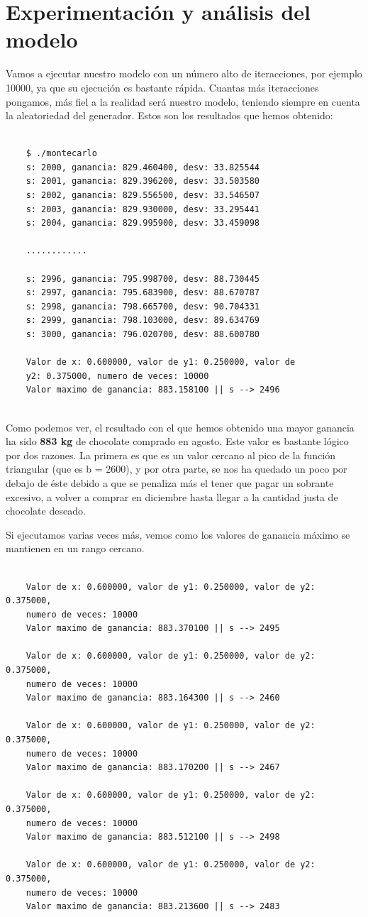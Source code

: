 \documentclass[11pt,a4paper]{article}
\begin{document}
\newpage
\section{Experimentación y análisis del modelo}

Vamos a ejecutar nuestro modelo con un número alto de iteracciones, por ejemplo 10000, ya que su ejecución es bastante rápida. Cuantas más iteracciones
pongamos, más fiel a la realidad será nuestro modelo, teniendo siempre en cuenta la aleatoriedad del generador. Estos son los resultados que hemos
obtenido:
\begin{lstlisting}

	$ ./montecarlo
	s: 2000, ganancia: 829.460400, desv: 33.825544
	s: 2001, ganancia: 829.396200, desv: 33.503580
	s: 2002, ganancia: 829.556500, desv: 33.546507
	s: 2003, ganancia: 829.930000, desv: 33.295441
	s: 2004, ganancia: 829.995900, desv: 33.459098

	............

	s: 2996, ganancia: 795.998700, desv: 88.730445
	s: 2997, ganancia: 795.683900, desv: 88.670787
	s: 2998, ganancia: 798.665700, desv: 90.704331
	s: 2999, ganancia: 798.103000, desv: 89.634769
	s: 3000, ganancia: 796.020700, desv: 88.600780

	Valor de x: 0.600000, valor de y1: 0.250000, valor de
	y2: 0.375000, numero de veces: 10000
	Valor maximo de ganancia: 883.158100 || s --> 2496
	
\end{lstlisting}

Como podemos ver, el resultado con el que hemos obtenido una mayor ganancia ha sido \textbf{883 kg} de chocolate comprado en agosto. Este valor es
bastante lógico por dos razones. La primera es que es un valor cercano al pico de la función triangular (que es b = 2600), y por otra parte, se nos ha
quedado un poco por debajo de éste debido a que se penaliza más el tener que pagar un sobrante excesivo, a volver a comprar en diciembre hasta llegar a
la cantidad justa de chocolate deseado.

Si ejecutamos varias veces más, vemos como los valores de ganancia máximo se mantienen en un rango cercano.
\begin{lstlisting}

	Valor de x: 0.600000, valor de y1: 0.250000, valor de y2: 0.375000,
	numero de veces: 10000
	Valor maximo de ganancia: 883.370100 || s --> 2495

	Valor de x: 0.600000, valor de y1: 0.250000, valor de y2: 0.375000,
	numero de veces: 10000
	Valor maximo de ganancia: 883.164300 || s --> 2460

	Valor de x: 0.600000, valor de y1: 0.250000, valor de y2: 0.375000,
	numero de veces: 10000
	Valor maximo de ganancia: 883.170200 || s --> 2467
	
	Valor de x: 0.600000, valor de y1: 0.250000, valor de y2: 0.375000,
	numero de veces: 10000
	Valor maximo de ganancia: 883.512100 || s --> 2498

	Valor de x: 0.600000, valor de y1: 0.250000, valor de y2: 0.375000,
	numero de veces: 10000
	Valor maximo de ganancia: 883.213600 || s --> 2483
		
\end{lstlisting}
\end{document}
